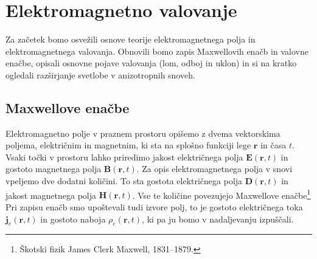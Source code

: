
\chapter{Elektromagnetno valovanje}
Za začetek bomo osvežili osnove teorije elektromagnetnega polja in 
elektromagnetnega valovanja. Obnovili bomo zapis Maxwellovih enačb in 
valovne enačbe, opisali osnovne pojave valovanja (lom, odboj in uklon)
in si na kratko ogledali razširjanje svetlobe v anizotropnih snoveh. 

\section{Maxwellove enačbe}
Elektromagnetno polje v praznem prostoru opišemo z dvema vektorskima
poljema, električnim in magnetnim, ki sta na splošno funkciji lege $\mathbf{r}$
in časa $t$. Vsaki točki v prostoru lahko priredimo jakost
električnega polja $\mathbf{E}(\mathbf{r},t)$ in gostoto
magnetnega polja $\mathbf{B}(\mathbf{r},t)$. Za opis elektromagnetnega
polja v snovi vpeljemo dve dodatni količini. To sta gostota
električnega polja $\mathbf{D}(\mathbf{r},t)$ in jakost magnetnega
polja $\mathbf{H}(\mathbf{r},t)$.
Vse te količine povezujejo Maxwellove
enačbe\footnote{Škotski fizik James Clerk Maxwell, 1831--1879.}
\\
Pri zapisu enačb smo upoštevali tudi izvore polj, to je gostoto
električnega toka $\mathbf{j}_e(\mathbf{r},t)$ in gostoto naboja $\rho_{e}(\mathbf{r},t)$, ki 
pa ju bomo v nadaljevanju izpuščali.

